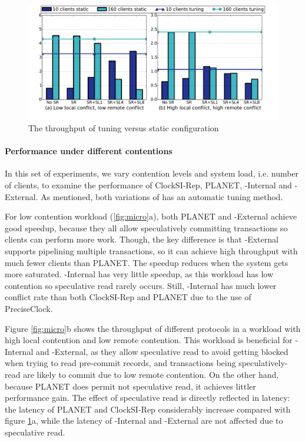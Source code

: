 \begin{figure}[t]
\centering
\def\svgwidth{0.98\columnwidth}
\includegraphics[scale = 0.28]{figures/tuning}
\vspace{-7mm}
\caption{\footnotesize The throughput of tuning versus static configuration}
\label{fig:tuning}
\end{figure}

\paragraph{Performance under different contentions} In this set of experiments, we vary contention levels and system load, i.e. number of clients, to examine the performance of ClockSI-Rep, PLANET, {\specula}-Internal and {\specula}-External. As mentioned, both variations of {\specula} has an automatic tuning method. 

For low contention workload (\ref{fig:micro}a), both PLANET and {\specula}-External achieve good speedup, because they all allow speculatively committing transactions so clients can perform more work. Though, the key difference is that {\specula}-External supports pipelining multiple transactions, so it can achieve high throughput with much fewer clients than PLANET. The speedup reduces when the system gets more saturated. {\specula}-Internal has very little speedup, as this workload has low contention so speculative read rarely occurs. Still, {\specula}-Internal has much lower conflict rate than both ClockSI-Rep and PLANET due to the use of PreciseClock.

Figure \ref{fig:micro}b shows the throughput of different protocols in a workload with high local contention and low remote contention. This workload is beneficial for {\specula}-Internal and {\specula}-External, as they allow speculative read to avoid getting blocked when trying to read pre-commit records, and transactions being speculatively-read are likely to commit due to low remote contention. On the other hand, because PLANET does permit not speculative read, it achieves littler performance gain. The effect of speculative read is directly reflected in latency: the latency of PLANET and ClockSI-Rep considerably increase compared with figure \ref{fig:tuning}a, while the latency of {\specula}-Internal and {\specula}-External are not affected due to speculative read.

